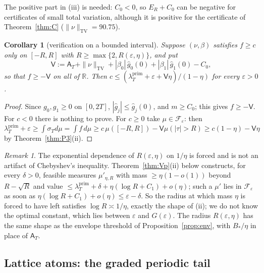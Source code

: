 \documentclass[11pt]{amsart}
\newtheorem{corollary}[theorem]{Corollary}
\theoremstyle{definition}
\theoremstyle{remark}
\newtheorem{remark}[theorem]{Remark}
\newcommand{\R}{\mathbb R}
\newcommand{\TV}{\operatorname{TV}}
\newcommand{\lamP}{\lambda^{\mathrm{prim}}_T}
\newcommand{\sT}{\sigma_T}
\newcommand{\gh}[1]{\widehat g_{#1}}
\newcommand{\Aconst}{\mathsf A_T}
\begin{document}
The positive part in (iii) is needed: $C_0<0$, so $E_R+C_0$ can be negative for certificates of
small total variation, although it is positive for the certificate of Theorem~\ref{thm:C}
($\|\nu\|_{\TV}=90.75$).

\begin{corollary}[verification on a bounded interval]\label{cor:AP}
Suppose $(\nu,\beta)$ satisfies $f\ge c$ \emph{only} on $[-R,R]$ with
$R\ge\max\{2,R(\varepsilon,\eta)\}$, and put
\[
\mathsf V:=\Aconst+\|\nu\|_{\TV}+|\beta_0|\,\gh0(0)+|\beta_1|\,\gh1(0)-C_0 ,
\]
so that $f\ge-\mathsf V$ on all of $\R$. Then $c\le(\lamP+\varepsilon+\mathsf V\eta)/(1-\eta)$ for
every $\varepsilon>0$.
\end{corollary}
\begin{proof}
Since $g_0,g_1\ge0$ on $[0,2T]$, $|\gh j|\le\gh j(0)$, and $m\ge C_0$; this gives $f\ge-\mathsf V$.
For $c<0$ there is nothing to prove. For $c\ge0$ take $\mu\in\mathcal F_\varepsilon$: then
$\lamP+\varepsilon\ge\int\sT d\mu=\int f\,d\mu\ge c\,\mu([-R,R])-\mathsf V\mu(|\tau|>R)\ge c(1-\eta)-\mathsf V\eta$
by Theorem~\ref{thm:P3}(ii).
\end{proof}

\begin{remark}\label{rem:P3exp}
The exponential dependence of $R(\varepsilon,\eta)$ on $1/\eta$ is forced and is not an artifact of
Chebyshev's inequality. Theorem~\ref{thm:Vp}(ii) below constructs, for every $\delta>0$, feasible measures
$\mu'_{\eta,R}$ with mass $\ge\eta(1-o(1))$ beyond $R-\sqrt R$ and value
$\le\lamP+\delta+\eta(\log R+C_1)+o(\eta)$; such a $\mu'$ lies in $\mathcal F_\varepsilon$ as soon as
$\eta(\log R+C_1)+o(\eta)\le\varepsilon-\delta$. So the radius at which mass $\eta$ is forced to have
left satisfies $\log R\asymp1/\eta$, exactly the shape of (ii); we do not know the optimal constant,
which lies between $\varepsilon$ and $G(\varepsilon)$. The radius $R(\varepsilon,\eta)$ has the same
shape as the envelope threshold of Proposition~\ref{prop:env}, with $B_*/\eta$ in place of $\Aconst$.
\end{remark}

\subsection{Lattice atoms: the graded periodic tail}
\end{document}
